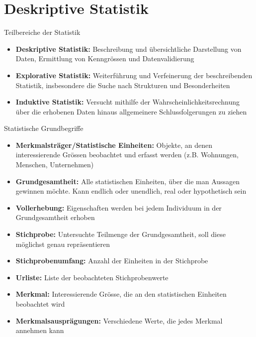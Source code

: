 \section{Deskriptive Statistik}

\begin{concept}{Teilbereiche der Statistik}
\begin{itemize}
    \item \textbf{Deskriptive Statistik:} Beschreibung und übersichtliche Darstellung von Daten, Ermittlung von Kenngrössen und Datenvalidierung
    \item \textbf{Explorative Statistik:} Weiterführung und Verfeinerung der beschreibenden Statistik, insbesondere die Suche nach Strukturen und Besonderheiten
    \item \textbf{Induktive Statistik:} Versucht mithilfe der Wahrscheinlichkeitsrechnung über die erhobenen Daten hinaus allgemeinere Schlussfolgerungen zu ziehen
\end{itemize}
\end{concept} 

\begin{definition}{Statistische Grundbegriffe}
\begin{itemize}
    \item \textbf{Merkmalsträger/Statistische Einheiten:} Objekte, an denen interessierende Grössen beobachtet und erfasst werden (z.B. Wohnungen, Menschen, Unternehmen)
    \item \textbf{Grundgesamtheit:} Alle statistischen Einheiten, über die man Aussagen gewinnen möchte. Kann endlich oder unendlich, real oder hypothetisch sein
    \item \textbf{Vollerhebung:} Eigenschaften werden bei jedem Individuum in der Grundgesamtheit erhoben
    \item \textbf{Stichprobe:} Untersuchte Teilmenge der Grundgesamtheit, soll diese möglichst genau repräsentieren
    \item \textbf{Stichprobenumfang:} Anzahl der Einheiten in der Stichprobe
    \item \textbf{Urliste:} Liste der beobachteten Stichprobenwerte
    \item \textbf{Merkmal:} Interessierende Grösse, die an den statistischen Einheiten beobachtet wird
    \item \textbf{Merkmalsausprägungen:} Verschiedene Werte, die jedes Merkmal annehmen kann
\end{itemize}
\end{definition}



